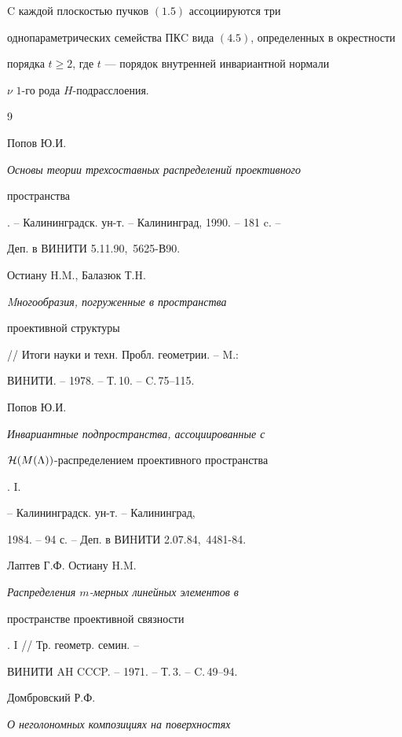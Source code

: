 \begin{thm}


C каждой плоскостью пучков $(1.5)$ ассоциируются три


однопараметрических семейства ПКC вида $(4.5)$, определенных в окрестности


порядка $t\ge 2$, где $t$ --- порядок внутренней инвариантной нормали


$\nu$\; $1$-го рода $H$-подрасслоения.


\end{thm}








\begin{thebibliography}{9}







Попов Ю.И. {\em Основы теории трехсоставных распределений проективного


пространства}. --  Калининградск. ун-т. -- Калининград, 1990. -- 181 c. --


Деп. в ВИHИТИ 5.11.90, \No\,5625-В90.




Остиану H.M., Балазюк Т.H. {\em Mногообразия, погруженные в пространства


проективной структуры} // Итоги науки и техн. Пробл. геометрии. -- M.:


ВИHИТИ. -- 1978. -- Т.\,10. -- C.\,75--115.




Попов Ю.И. {\em Инвариантные подпространства, ассоциированные с


${\cal H}(M(\Lambda))$-распределением проективного пространства}. I.


-- Калининградск. ун-т. -- Калининград,


1984. -- 94 с. -- Деп. в ВИHИТИ 2.07.84, \No\,4481-84.




Лаптев Г.Ф. Остиану H.M. {\em Распределения $m$-мерных линейных элементов в


пространстве проективной связности}. I // Тр. геометр. семин. --


ВИHИТИ AH CCCP. -- 1971. -- Т.\,3. -- C.\,49--94.




Домбровский Р.Ф. {\em О неголономных композициях на поверхностях


}
\end{thebibliography}
